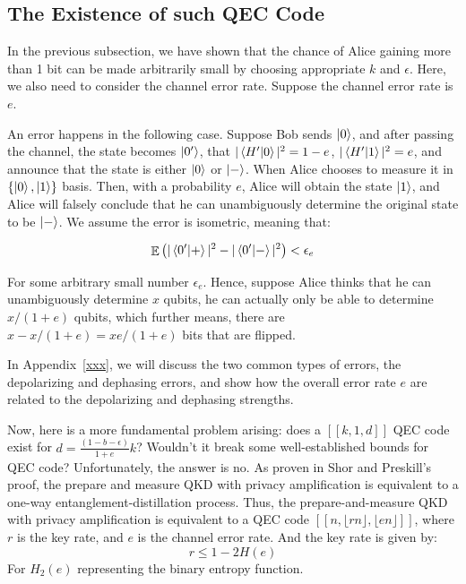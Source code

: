 \documentclass[%
 reprint,
superscriptaddress,
 amsmath,amssymb,
 aps,
]{revtex4-2}
\DeclareMathOperator{\EX}{\mathbb{E}}%
\begin{document}
\subsection{The Existence of such QEC Code}
\label{sec:QECC_existence}



In the previous subsection, we have shown that the chance of Alice gaining more than 1 bit can be made arbitrarily small by choosing appropriate $k$ and $\epsilon$. Here, we also need to consider the channel error rate. Suppose the channel error rate is $e$. 

An error happens in the following case. Suppose Bob sends $\ket{0}$, and after passing the channel, the state becomes $\ket{0'}$, that $|\bra{H'}\ket{0}|^2=1-e$, $|\bra{H'}\ket{1}|^2=e$, and announce that the state is either $\ket{0}$ or $\ket{-}$. When Alice chooses to measure it in $\{\ket{0},\ket{1}\}$ basis. Then, with a probability $e$, Alice will obtain the state $\ket{1}$, and Alice will falsely conclude that he can unambiguously determine the original state to be $\ket{-}$. We assume the error is isometric, meaning that:

\begin{equation}
    \EX{\left(|\bra{0'}\ket{+}|^2-|\bra{0'}\ket{-}|^2\right)<\epsilon_{e}}
\end{equation}

For some arbitrary small number $\epsilon_e$. Hence, suppose Alice thinks that he can unambiguously determine $x$ qubits, he can actually only be able to determine $x/(1+e)$ qubits, which further means, there are $x-x/(1+e)=xe/(1+e)$ bits that are flipped. 

In Appendix~\ref{xxx}, we will discuss the two common types of errors, the depolarizing and dephasing errors, and show how the overall error rate $e$ are related to the depolarizing and dephasing strengths.


Now, here is a more fundamental problem arising: does a $[[k, 1, d]]$ QEC code exist for $d=\frac{(1-b-\epsilon)}{1+e}k$? Wouldn't it break some well-established bounds for QEC code? Unfortunately, the answer is no. As proven in Shor and Preskill's proof, the prepare and measure QKD with privacy amplification is equivalent to a one-way entanglement-distillation process. Thus, the prepare-and-measure QKD with privacy amplification is equivalent to a QEC code $[[n, \lfloor rn\rfloor, \lfloor en\rfloor]]$, where $r$ is the key rate, and $e$ is the channel error rate. And the key rate is given by:
\begin{equation}
    r\le 1-2H(e)
\end{equation}
For $H_2(e)$ representing the binary entropy function.
\end{document}
